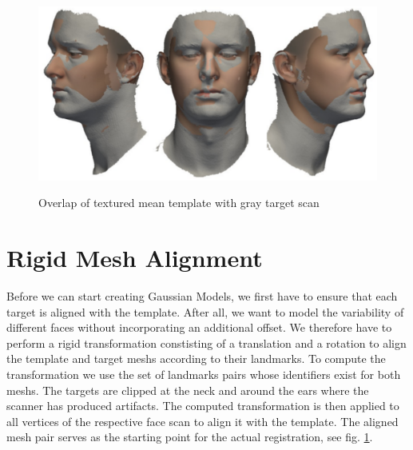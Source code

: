 \begin{figure}[h!]
\centering
\includegraphics[width=.8\textwidth]{./resources/img/overlap_mean_target.pdf}\\
\caption{Overlap of textured mean template with gray target scan}
\label{fig:overlap}
\end{figure}

\section{Rigid Mesh Alignment}
Before we can start creating Gaussian Models, we first have to ensure that each target is aligned with the template. After all, we want to model the variability of different faces without incorporating an additional offset. We therefore have to perform a rigid transformation constisting of a translation and a rotation to align the template and target meshs according to their landmarks. To compute the transformation we use the set
of landmarks pairs whose identifiers exist for both meshs. The targets are clipped at the neck and around the ears where the scanner has produced artifacts. The computed transformation is then applied to all vertices of the respective face scan to align it with the template. The aligned mesh pair serves as the starting point for the actual registration, see fig. \ref{fig:overlap}.\newline
\newline

